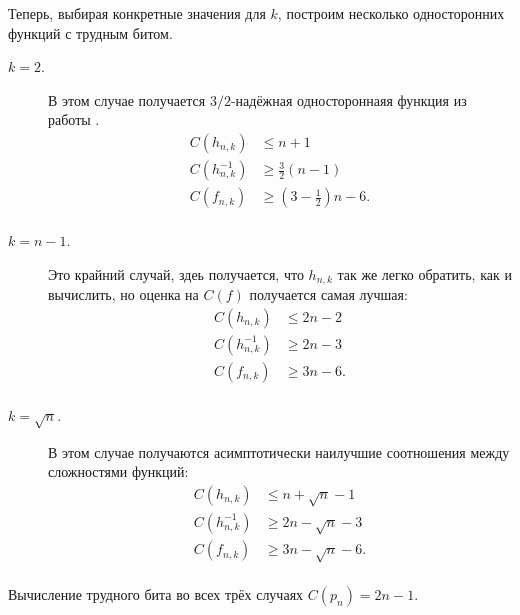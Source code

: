 \documentclass[oneside, a4paper]{article}
\theoremstyle{definition}
\theoremstyle{remark}
\begin{document}
Теперь, выбирая конкретные значения для $k$, построим несколько односторонних
функций с трудным битом.
\begin{description}
\item[$k = 2$.] В этом случае получается $3/2$-надёжная одностороннаяя функция
из работы \cite{hiltgen}.
\[
\begin{aligned}
C(h_{n, k}) &\leq n + 1 \\
C(h_{n, k}^{-1}) &\geq \frac 3 2 (n - 1) \\
C(f_{n, k}) &\geq (3 - \frac 1 2)n - 6. \\
\end{aligned}
\]
\item[$k = n - 1$.] Это крайний случай, здеь получается, что $h_{n, k}$ так же
легко обратить, как и вычислить, но оценка на $C(f)$ получается самая лучшая:
\[
\begin{aligned}
C(h_{n, k}) &\leq 2n - 2 \\
C(h_{n, k}^{-1}) &\geq 2n - 3 \\
C(f_{n, k}) &\geq 3n - 6. \\
\end{aligned}
\]
\item[$k = \sqrt{n}$.] В этом случае получаются асимптотически наилучшие
соотношения между сложностями функций:
\[
\begin{aligned}
C(h_{n, k}) &\leq n + \sqrt{n} - 1 \\
C(h_{n, k}^{-1}) &\geq 2n - \sqrt n - 3 \\
C(f_{n, k}) &\geq 3n - \sqrt{n} - 6. \\
\end{aligned}
\]
\end{description}
Вычисление трудного бита во всех трёх случаях $C(p_n) = 2n - 1$.

{}

\end{document}
